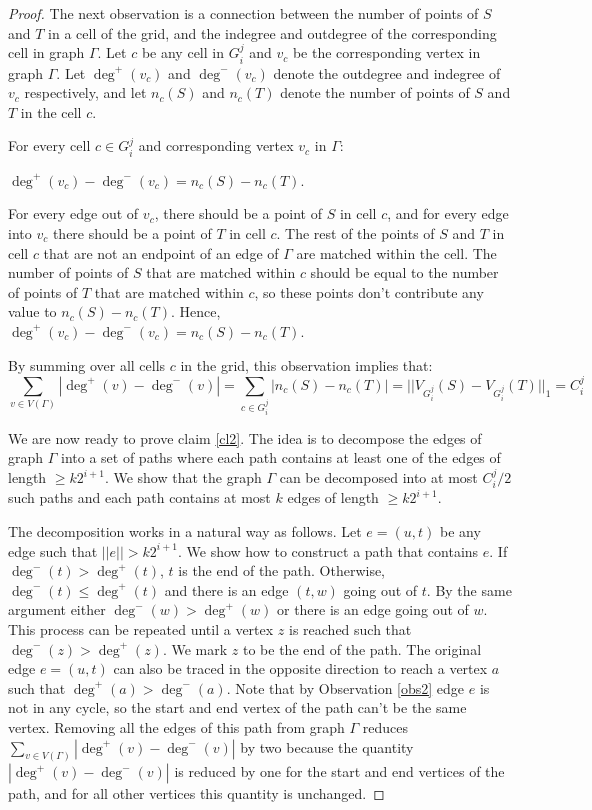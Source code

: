 \documentclass[oribibl]{llncs}
\begin{document}
\begin{proof}
The next observation is a connection between the number of points of $S$ and $T$
in a cell of the grid, and the indegree and outdegree of the corresponding cell
in graph $\Gamma$. Let $c$ be any cell in $G_i^j$ and $v_c$ be the corresponding
vertex in graph $\Gamma$. Let $\deg^+(v_c)$ and $\deg^-(v_c)$ denote the
outdegree and indegree of $v_c$ respectively, and let $n_c(S)$ and $n_c(T)$
denote the number of points of $S$ and $T$ in the cell $c$.
\begin{observation}
For every cell $c\in G_i^j$ and corresponding vertex $v_c$ in $\Gamma$:

$\deg^+(v_c)-\deg^-(v_c)=n_c(S)-n_c(T)$.
\end{observation}
For every edge out of $v_c$,
there should be a point of $S$ in cell $c$, and for every edge into $v_c$ there
should be a point of $T$ in cell $c$. The rest of the points of $S$ and $T$
in cell $c$ that are not an endpoint of an edge of $\Gamma$ are matched within
the cell. The number of points of $S$ that are matched within $c$ should be
equal to the number of points of $T$ that are matched within $c$, so these
points don't contribute any value to $n_c(S)-n_c(T)$.
Hence, $\deg^+(v_c)-\deg^-(v_c)=n_c(S)-n_c(T)$. 

By summing over all cells $c$ in the grid, this observation implies that:
\begin{equation}\label{eq4}
 \sum_{v\in{V(\Gamma)}}|\deg^+(v)-\deg^-(v)| = \sum_{c\in G_i^j}|n_c(S)-n_c(T)| = ||V_{G_i^j}(S)-V_{G_i^j}(T)||_1 = C_i^j
\end{equation}

We are now ready to prove claim \ref{cl2}. The idea is
to decompose the edges of graph $\Gamma$ into a
set of paths where each path contains at least one of the edges of length
$\ge k2^{i+1}$.
We show that the graph $\Gamma$ can be decomposed into at most
$C_i^j/2$ such paths and each path contains at most $k$
edges of length $\ge k2^{i+1}$.

The decomposition works in a natural way as follows.
Let $e=(u,t)$ be any edge such that $||e|| > k2^{i+1}$.
We show how to construct a path that contains $e$.
If $\deg^-(t) > \deg^+(t)$, $t$ is the end of the path. Otherwise,
$\deg^-(t) \le \deg^+(t)$ and there is an edge $(t,w)$ going out of $t$. By
the same argument either $\deg^-(w) > \deg^+(w)$ or there is an edge going
out of $w$. This process can be repeated until a vertex $z$ is reached such
that $\deg^-(z) > \deg^+(z)$. We mark $z$ to be the end of the path.
The original edge $e=(u,t)$ can also be traced in the opposite direction to
reach a vertex $a$ such that $\deg^+(a) > \deg^-(a)$.
Note that by Observation \ref{obs2}
edge $e$ is not in any cycle, so the start and end vertex of the path can't
be the same vertex. Removing all the edges of this path from graph $\Gamma$
reduces $\sum_{v\in{V(\Gamma)}}|\deg^+(v)-\deg^-(v)|$ by two because
the quantity $|\deg^+(v)-\deg^-(v)|$ is reduced by one 
for the start and end vertices of the path, and for all
other vertices this quantity is unchanged.


\end{proof}
\end{document}
